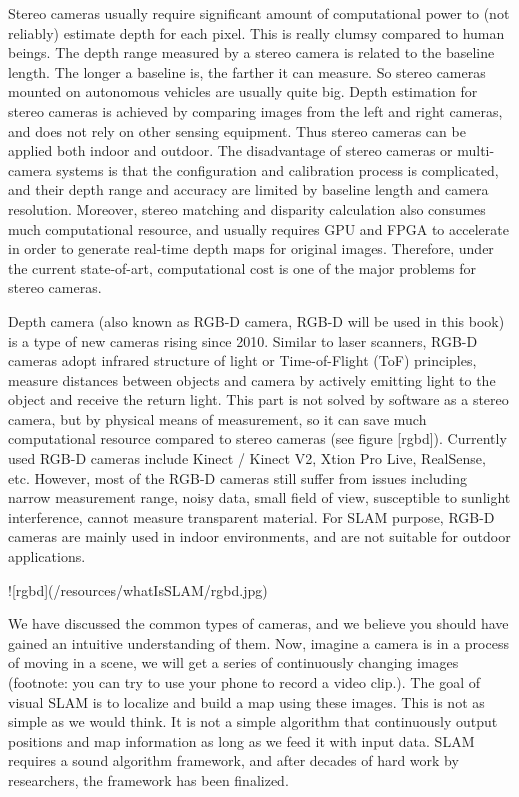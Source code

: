 Stereo cameras usually require significant amount of computational power to (not reliably) estimate depth for each pixel. This is really clumsy compared to human beings. The depth range measured by a stereo camera is related to the baseline length. The longer a baseline is, the farther it can measure. So stereo cameras mounted on autonomous vehicles are usually quite big. Depth estimation for stereo cameras is achieved by comparing images from the left and right cameras, and does not rely on other sensing equipment. Thus stereo cameras can be applied both indoor and outdoor. The disadvantage of stereo cameras or multi-camera systems is that the configuration and calibration process is complicated, and their depth range and accuracy are limited by baseline length and camera resolution. Moreover, stereo matching and disparity calculation also consumes much computational resource, and usually requires GPU and FPGA to accelerate in order to generate real-time depth maps for original images. Therefore, under the current state-of-art, computational cost is one of the major problems for stereo cameras.

Depth camera (also known as RGB-D camera, RGB-D will be used in this book) is a type of new cameras rising since 2010. Similar to laser scanners, RGB-D cameras adopt infrared structure of light or Time-of-Flight (ToF) principles, measure distances between objects and camera by actively emitting light to the object and receive the return light. This part is not solved by software as a stereo camera, but by physical means of measurement, so it can save much computational resource compared to stereo cameras (see figure [rgbd]). Currently used RGB-D cameras include Kinect / Kinect V2, Xtion Pro Live, RealSense, etc. However, most of the RGB-D cameras still suffer from issues including narrow measurement range, noisy data, small field of view, susceptible to sunlight interference, cannot measure transparent material. For SLAM purpose, RGB-D cameras are mainly used in indoor environments, and are not suitable for outdoor applications.

![rgbd](/resources/whatIsSLAM/rgbd.jpg)

We have discussed the common types of cameras, and we believe you should have gained an intuitive understanding of them. Now, imagine a camera is in a process of moving in a scene, we will get a series of continuously changing images (footnote: you can try to use your phone to record a video clip.). The goal of visual SLAM is to localize and build a map using these images. This is not as simple as we would think. It is not a simple algorithm that continuously output positions and map information as long as we feed it with input data. SLAM requires a sound algorithm framework, and after decades of hard work by researchers, the framework has been finalized.

